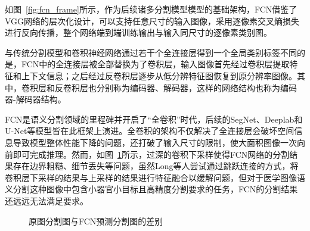 如图~\ref{fig:fcn_frame}所示，作为后续诸多分割模型模型的基础架构，FCN借鉴了VGG网络的层次化设计，可以支持任意尺寸的输入图像，采用逐像素交叉熵损失进行反向传播，整个网络端到端训练输出与输入同尺寸的逐像素类别图。

与传统分割模型和卷积神经网络通过若干个全连接层得到一个全局类别标签不同的是，FCN中的全连接层被全部替换为了卷积层，输入图像首先经过卷积层提取特征和上下文信息；之后经过反卷积层逐步从低分辨特征图恢复到原分辨率图像。其中，卷积层和反卷积层也分别称为编码器、解码器，这样的网络结构也称为编码器-解码器结构。

FCN是语义分割领域的里程碑并开启了“全卷积”时代，后续的SegNet、Deeplab和U-Net等模型皆在此框架上演进。全卷积的架构不仅解决了全连接层会破坏空间信息导致模型整体性能下降的问题，还打破了输入尺寸的限制，使大面积图像一次向前即可完成推理。然而，如图~\ref{fig:fcn_pre}所示，过深的卷积下采样使得FCN网络的分割结果存在边界粗糙、细节丢失等问题，虽然Long等人\cite{shelhamer2016}尝试通过跳跃连接的方式，将卷积层下采样的结果与上采样的结果进行特征融合以缓解问题，但对于医学图像语义分割这种图像中包含小器官小目标且高精度分割要求的任务，FCN的分割结果还远远无法满足要求。

\begin{figure}[htbp]
    \centering
    \hspace{1cm}
    \hspace{1cm}
    \caption{原图分割图与FCN预测分割图的差别\cite{shelhamer2016}}
    \label{fig:fcn_pre}
\end{figure}

